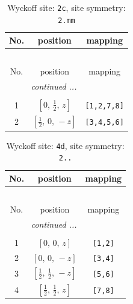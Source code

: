 \documentclass[fleqn,8pt]{jsarticle}
\begin{document}
\renewcommand{\arraystretch}{1.2}
\begin{longtable}{ccc}
\caption{Wyckoff site: {\tt 2c}, site symmetry: {\tt 2.mm}}
 \\
 \hline \hline
No. & position & mapping \\ \hline \endfirsthead

\multicolumn{2}{l}{\tablename\ \thetable{}} \\
 \hline \hline
No. & position & mapping \\ \hline \endhead

 \hline \hline
\multicolumn{2}{r}{\footnotesize\it continued ...} \\ \endfoot

 \hline \hline
\multicolumn{2}{r}{} \\ \endlastfoot

1 & $\left[ 0,\, \frac{1}{2},\, z \right]$ & {\tt [1,2,7,8]} \\ \hline
2 & $\left[ \frac{1}{2},\, 0,\, - z \right]$ & {\tt [3,4,5,6]} \\
\end{longtable}
\renewcommand{\arraystretch}{1.2}
\begin{longtable}{ccc}
\caption{Wyckoff site: {\tt 4d}, site symmetry: {\tt 2..}}
 \\
 \hline \hline
No. & position & mapping \\ \hline \endfirsthead

\multicolumn{2}{l}{\tablename\ \thetable{}} \\
 \hline \hline
No. & position & mapping \\ \hline \endhead

 \hline \hline
\multicolumn{2}{r}{\footnotesize\it continued ...} \\ \endfoot

 \hline \hline
\multicolumn{2}{r}{} \\ \endlastfoot

1 & $\left[ 0,\, 0,\, z \right]$ & {\tt [1,2]} \\ \hline
2 & $\left[ 0,\, 0,\, - z \right]$ & {\tt [3,4]} \\ \hline
3 & $\left[ \frac{1}{2},\, \frac{1}{2},\, - z \right]$ & {\tt [5,6]} \\ \hline
4 & $\left[ \frac{1}{2},\, \frac{1}{2},\, z \right]$ & {\tt [7,8]} \\
\end{longtable}
\renewcommand{\arraystretch}{1.2}
\end{document}
